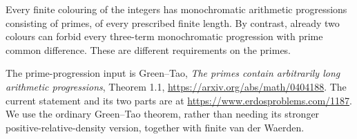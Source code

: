 Every finite colouring of the integers has monochromatic arithmetic progressions consisting of primes, of every prescribed finite length. By contrast, already two colours can forbid every three-term monochromatic progression with prime common difference. These are different requirements on the primes.

The prime-progression input is Green--Tao, \emph{The primes contain arbitrarily long arithmetic progressions}, Theorem 1.1, \url{https://arxiv.org/abs/math/0404188}. The current statement and its two parts are at \url{https://www.erdosproblems.com/1187}. We use the ordinary Green--Tao theorem, rather than needing its stronger positive-relative-density version, together with finite van der Waerden.
